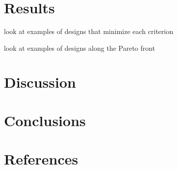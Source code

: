 \documentclass[review]{elsarticle}
\begin{document}
\section{Results}

look at examples of designs that minimize each criterion

look at examples of designs along the Pareto front


\section{Discussion}




\section{Conclusions}



\section*{References}


\end{document}
